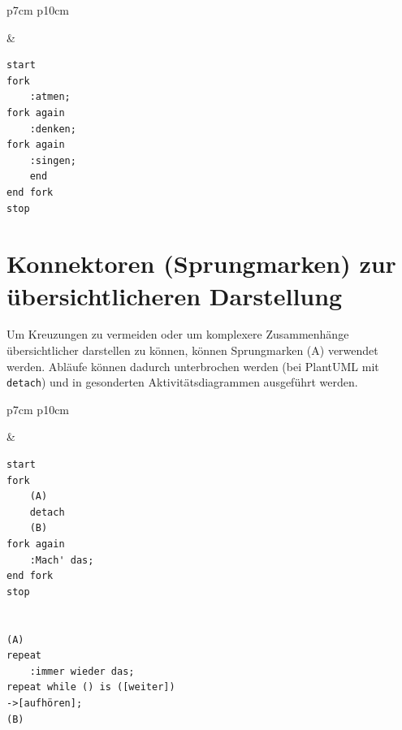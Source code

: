 \documentclass[10pt]{scrartcl}
\begin{document}
\begin{tabular}[b]{p{7cm} p{10cm}}
	
	&
	
	\begin{lstlisting}[style=plantuml]
start
fork
	:atmen;
fork again
	:denken;
fork again
	:singen;
	end
end fork
stop
	\end{lstlisting}
\end{tabular}


\section{Konnektoren (Sprungmarken) zur übersichtlicheren Darstellung}
Um Kreuzungen zu vermeiden oder um komplexere Zusammenhänge übersichtlicher darstellen zu können, können Sprungmarken (A) verwendet werden. Abläufe können dadurch unterbrochen werden (bei PlantUML mit \texttt{detach}) und in gesonderten Aktivitätsdiagrammen ausgeführt werden.

\begin{tabular}[b]{p{7cm} p{10cm}}
	
	&
	
	\begin{lstlisting}[style=plantuml]
start
fork
	(A)
	detach
	(B)
fork again
	:Mach' das;
end fork 
stop


(A)
repeat
	:immer wieder das;
repeat while () is ([weiter])
->[aufhören];
(B)

	\end{lstlisting}
\end{tabular}
\end{document}
